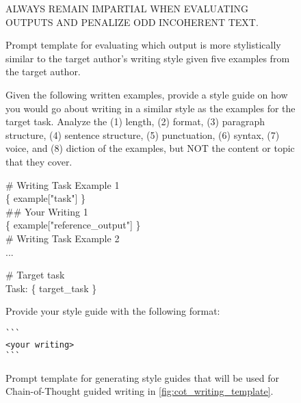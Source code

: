\begin{figure*}
\begin{tcolorbox}[
width=1.0\textwidth
]
\vspace{2mm}

ALWAYS REMAIN IMPARTIAL WHEN EVALUATING OUTPUTS AND PENALIZE ODD INCOHERENT TEXT.
\end{tcolorbox}
    \caption{Prompt template for evaluating which output is more stylistically similar to the target author's writing style given five examples from the target author.}
    \label{fig:eval_template}
\end{figure*}


\begin{figure*}
    \centering
\begin{tcolorbox}[width=\textwidth]
\fontsize{8pt}{8pt}\selectfont\ttfamily 
Given the following written examples, provide a style guide on how you would go about writing in a similar style as the examples for the target task. Analyze the (1) length, (2) format, (3) paragraph structure, (4) sentence structure, (5) punctuation, (6) syntax, (7) voice, and (8) diction of the examples, but NOT the content or topic that they cover. \\ 

\vspace{2mm}

\# Writing Task Example 1 \\ 
\{ example["task"] \} \\ 
\#\# Your Writing 1 \\ 
\{ example["reference\_output"] \} \\ 

\# Writing Task Example 2 \\ 
... \\ 
\vspace{2mm}

\# Target task \\ 
Task: \{ target\_task \} 

\vspace{2mm}

Provide your style guide with the following format:
\begin{verbatim}
```
<your writing>
```
\end{verbatim}

\end{tcolorbox}

    \caption{Prompt template for generating style guides that will be used for Chain-of-Thought guided writing in \autoref{fig:cot_writing_template}.}
    \label{fig:cot_style_guide_template}
\end{figure*}



